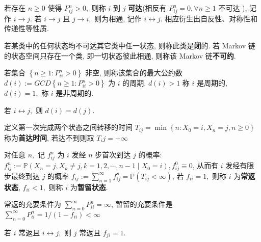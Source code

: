 \documentclass[10pt]{yerbaformat}
\begin{document}
\begin{definition}
    若存在 $n \geq 0$ 使得 $P_{i j}^{n}>0,$ 则称 $i$ 到 $j$ \textbf{可达}(相反有 $P_{i j}^{n}=0, \forall n \geq 1$ 不可达 ), 记作 $i \rightarrow j .$ 若 $i \rightarrow j$ 且 $j \rightarrow i,$ 则为相通, 记作 $i \leftrightarrow j$. 相应衍生出自反性、对称性和传递性等性质.
\end{definition}

\begin{definition}
    若某类中的任何状态均不可达其它类中任一状态, 则称此类是\textbf{闭}的. 若 Markov 链的状态空间只存在一个类, 即一切状态彼此相通, 则称该 Markov 链\textbf{不可约}.
\end{definition}

\begin{definition}[周期]
    若集合 $\left\{n \geq 1: P_{i i}^{n}>0\right\}$ 非空, 则称该集合的最大公约数 $d(i):=G C D\left\{n \geq 1: P_{i i}^{n}>0\right\}$ 为 $i$ 的周期. $d(i)>1$ 称 $i$ 是周期的, $d(i)=1,$ 称 $i$ 是非周期的.
\end{definition}

\begin{lemma}
    若 $i \leftrightarrow j,$ 则 $d(i)=d(j) .$
\end{lemma}

\begin{definition}[首达时间]
    定义第一次完成两个状态之间转移的时间 $T_{i j}=\min \left\{n: X_{0}=i, X_{n}=j, n \geq 0\right\}$ 称为\textbf{首达时间}, 若达不到则取 $T_ij=+\infty$
\end{definition}

\begin{definition}
    对任意 $n,$ 记 $f_{i j}^{n}$ 为 $i$ 发经 $n$ 步首次到达 $j$ 的概率: $f_{i j}^{n}:=\mathbb{P}\left(X_{n}=j, X_{k} \neq j, k=1,2, \cdots, n-1 \mid X_{0}=i\right), f_{i j}^{0} \equiv 0 $, 从而有 $i$ 发经有限步最终到达 $j$ 的概率 $f_{i j}:=\sum_{n=1}^{\infty} f_{i j}^{n}=\mathbb{P}\left(T_{i j}<\infty\right)$, 若 $f_{i i}=1,$ 则称 $i$ 为\textbf{常返状态}, $f_{i i}<1,$ 则称 $i$ 为\textbf{暂留状态}.
\end{definition}

\begin{definition}[判定定理]
    常返的充要条件为 $\sum_{n=0}^{\infty} P_{i i}^{n}=\infty$, 暂留的充要条件是 $\sum_{n=0}^{\infty} P_{i i}^{n}=1 /\left(1-f_{i i}\right)<\infty$
\end{definition}

\begin{corollary}
    若 $i$ 常返且 $i \leftrightarrow j,$ 则 $j$ 常返且 $f_{j i}=1 .$
\end{corollary}
\end{document}
